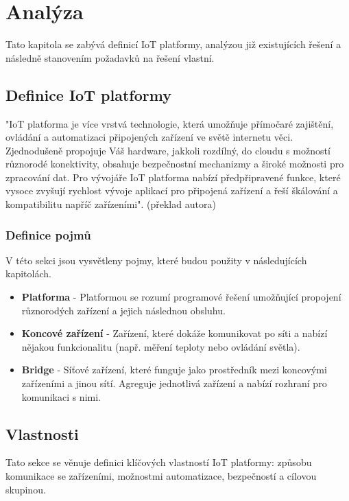\chapter{Analýza}
Tato kapitola se zabývá definicí IoT platformy, analýzou již existujících řešení a následně stanovením požadavků na řešení vlastní.


\section{Definice IoT platformy}
"IoT platforma je více vrstvá technologie, která umožňuje přímočaré zajištění, ovládání a automatizaci připojených zařízení ve světě internetu věci. Zjednodušeně propojuje Váš hardware, jakkoli rozdílný, do cloudu s možností různorodé konektivity, obsahuje bezpečnostní mechanizmy a široké možnosti pro zpracování dat. Pro vývojáře IoT platforma nabízí předpřipravené funkce, které vysoce zvyšují rychlost vývoje aplikací pro připojená zařízení a řeší škálování a kompatibilitu napříč zařízeními". (překlad autora) \cite{kaaproject}

\subsection{Definice pojmů}
V této sekci jsou vysvětleny pojmy, které budou použity v následujících kapitolách.

\begin{itemize}
    \item \textbf{Platforma} - Platformou se rozumí programové řešení umožňující propojení různorodých zařízení a jejich následnou obsluhu.
    \item \textbf{Koncové zařízení} - Zařízení, které dokáže komunikovat po síti a nabízí nějakou funkcionalitu (např. měření teploty nebo ovládání světla).
    \item \textbf{Bridge} - Síťové zařízení, které funguje jako prostředník mezi koncovými zařízeními a jinou sítí. Agreguje jednotlivá zařízení a nabízí rozhraní pro komunikaci s nimi.
\end{itemize}


\section{Vlastnosti}
Tato sekce se věnuje definici klíčových vlastností IoT platformy: způsobu komunikace se zařízeními, možnostmi automatizace, bezpečností a cílovou skupinou.

